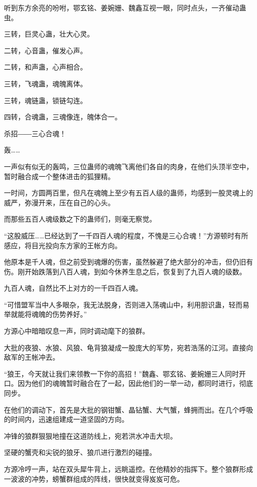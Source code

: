 
\begin{this_body}

听到东方余亮的吩咐，鄂玄铭、姜婉姗、魏鑫互视一眼，同时点头，一齐催动蛊虫。

三转，巨灵心蛊，壮大心灵。

二转，心音蛊，催发心声。

二转，和声蛊，心声相合。

三转，飞魂蛊，魂魄离体。

三转，魂链蛊，锁链勾连。

四转，合魂蛊，三魂像连，魄体合一。

杀招――三心合魂！

轰……

一声似有似无的轰鸣，三位蛊师的魂魄飞离他们各自的肉身，在他们头顶半空中，暂时融合成一个整体进击的狐狸精。

一时间，方圆两百里，但凡在魂魄上至少有五百人级的蛊师，均感到一股灵魂上的威严，弥漫开来，压在自己的心头。

而那些五百人魂级数之下的蛊师们，则毫无察觉。

“这股威压……已经达到了一千四百人魂的程度，不愧是三心合魂！”方源顿时有所感应，将目光投向东方家的王帐方向。

他原本是千人魂，但之前受到魂爆的伤害，虽然躲避了绝大部分的冲击，但仍旧有伤。刚开始跌落到八百人魂，到如今休养生息之后，恢复到了九百人魂的级数。

九百人魂，自然比不上对方的一千四百人魂。

“可惜盟军当中人多眼杂，我无法脱身，否则进入荡魂山中，利用胆识蛊，轻而易举就能将魂魄的伤势养好。”

方源心中暗暗叹息一声，同时调动麾下的狼群。

大批的夜狼、水狼、风狼、龟背狼凝成一股庞大的军势，宛若浩荡的江河。直接向敌军的王帐冲去。

“狼王，今天就让我们来领教一下你的高招！”魏鑫、鄂玄铭、姜婉姗三人同时开口。因为他们的魂魄暂时融合在了一起，因此他们的一举一动，都同时进行，彻底同步。

在他们的调动下，首先是大批的钢钳蟹、晶钻蟹、大气蟹，蜂拥而出。在几个呼吸的时间内，迅速组建成一道坚固的方向。

冲锋的狼群狠狠地撞在这道防线上，宛若洪水冲击大坝。

坚硬的蟹壳和尖锐的狼牙、狼爪进行激烈的碰撞。

方源冷哼一声，站在双头犀牛背上，远眺遥控。在他精妙的指挥下。整个狼群形成一波波的冲势，螃蟹群组成的阵线，很快就变得岌岌可危。


\end{this_body}
